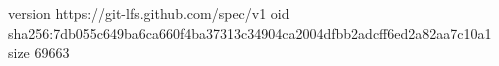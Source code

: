 version https://git-lfs.github.com/spec/v1
oid sha256:7db055c649ba6ca660f4ba37313c34904ca2004dfbb2adcff6ed2a82aa7c10a1
size 69663
